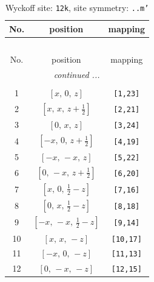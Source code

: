 \documentclass[fleqn,8pt]{jsarticle}
\begin{document}
\begin{longtable}{ccc}
\caption{Wyckoff site: {\tt 12k}, site symmetry: {\tt ..m'}}
 \\
 \hline \hline
No. & position & mapping \\ \hline \endfirsthead

\multicolumn{2}{l}{\tablename\ \thetable{}} \\
 \hline \hline
No. & position & mapping \\ \hline \endhead

 \hline \hline
\multicolumn{2}{r}{\footnotesize\it continued ...} \\ \endfoot

 \hline \hline
\multicolumn{2}{r}{} \\ \endlastfoot

1 & $\left[ x,\, 0,\, z \right]$ & {\tt [1,23]} \\ \hline
2 & $\left[ x,\, x,\, z + \frac{1}{2} \right]$ & {\tt [2,21]} \\ \hline
3 & $\left[ 0,\, x,\, z \right]$ & {\tt [3,24]} \\ \hline
4 & $\left[ - x,\, 0,\, z + \frac{1}{2} \right]$ & {\tt [4,19]} \\ \hline
5 & $\left[ - x,\, - x,\, z \right]$ & {\tt [5,22]} \\ \hline
6 & $\left[ 0,\, - x,\, z + \frac{1}{2} \right]$ & {\tt [6,20]} \\ \hline
7 & $\left[ x,\, 0,\, \frac{1}{2} - z \right]$ & {\tt [7,16]} \\ \hline
8 & $\left[ 0,\, x,\, \frac{1}{2} - z \right]$ & {\tt [8,18]} \\ \hline
9 & $\left[ - x,\, - x,\, \frac{1}{2} - z \right]$ & {\tt [9,14]} \\ \hline
10 & $\left[ x,\, x,\, - z \right]$ & {\tt [10,17]} \\ \hline
11 & $\left[ - x,\, 0,\, - z \right]$ & {\tt [11,13]} \\ \hline
12 & $\left[ 0,\, - x,\, - z \right]$ & {\tt [12,15]} \\
\end{longtable}
\renewcommand{\arraystretch}{1.2}
\end{document}
